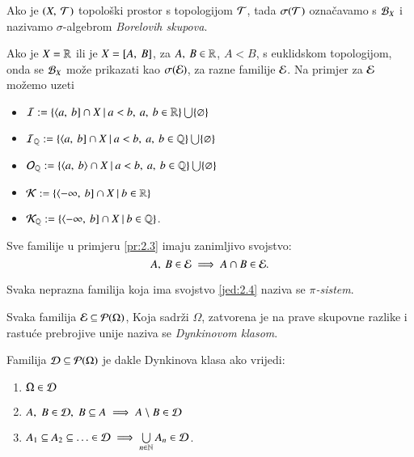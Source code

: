 \begin{defn}
    Ako je $(X, \: \mathcal{T})$ topolo\v ski prostor s topologijom $\mathcal{T}$, tada $\sigma({\mathcal{T}})$ ozna\v cavamo s $\mathcal{B}_{X}$ i nazivamo $\sigma$-algebrom \emph{Borelovih skupova}.        
\end{defn}

\begin{pr}  \label{pr:2.3}
    Ako je $X = \mathbb{R}$ ili je $X = [{A}, \:{B}]$, za $A, \: B \in \mathbb{R}$, $A < B$, s euklidskom topologijom, onda se $\mathcal{B}_{X}$ mo\v ze prikazati kao $\sigma({\mathcal{E}})$, za razne familije $\mathcal{E}$.
    Na primjer za $\mathcal{E}$ mo\v zemo uzeti
    \begin{itemize}
        \item $\mathcal{I} := \{{\langle {a}, \: {b}] \cap X} \: | \: {a < b, \:
            a, \: b \in \mathbb{R}}\} \bigcup \{\varnothing\}$
        \item $\mathcal{I}_{\mathbb{Q}} := \{{\langle {a}, \: {b}] \cap X} \: | \: {a < b,
            \: a, \: b \in \mathbb{Q}}\} \bigcup \{ \varnothing \}$
        \item $\mathcal{O}_{\mathbb{Q}} := \{{\langle {a}, \: {b} \rangle \cap X} \: | \: {a < b,
            \: a, \: b \in \mathbb{Q}}\} \bigcup \{ \varnothing \}$
        \item $\mathcal{K} := \{{\langle {-\infty}, \: {b}] \cap X} \: | \: {b
            \in \mathbb{R}}\}$
        \item $\mathcal{K}_{\mathbb{Q}} := \{{\langle {-\infty}, \: {b}]
            \cap X} \: | \: {b \in \mathbb{Q}}\}$.
    \end{itemize}
\end{pr}

Sve familije u primjeru \ref{pr:2.3} imaju zanimljivo svojstvo:
\begin{equation}    \label{jed:2.4}
    A, \: B \in \mathcal{E} \implies A \cap B \in \mathcal{E}.
\end{equation}

Svaka neprazna familija koja ima svojstvo \eqref{jed:2.4} naziva se \emph{$\pi$-sistem}.

Svaka familija $\mathcal{E} \subseteq \mathcal{P}({\Omega})$, Koja sadr\v zi $\Omega$, zatvorena je na prave skupovne razlike i rastu\' ce prebrojive unije naziva se \emph{Dynkinovom klasom}.

\begin{nap} \label{nap:2.4-1}
    Familija $\mathcal{D} \subseteq \mathcal{P}({\Omega})$ je dakle Dynkinova klasa ako vrijedi:
    \begin{enumerate}[label=(\roman*)]
        \item   \label{nap:2.4-1.1}
        $\Omega \in \mathcal{D}$
        \item   \label{nap:2.4-1.2}
        $A, \; B \in \mathcal{D}, \; B \subseteq A \implies A \setminus B \in \mathcal{D}$
        \item $A_1 \subseteq A_2 \subseteq \ldots \in \mathcal{D} \implies \bigcup\limits_{n \in \mathbb{N}}^{} A_n \in \mathcal{D}$.
    \end{enumerate}
\end{nap}

